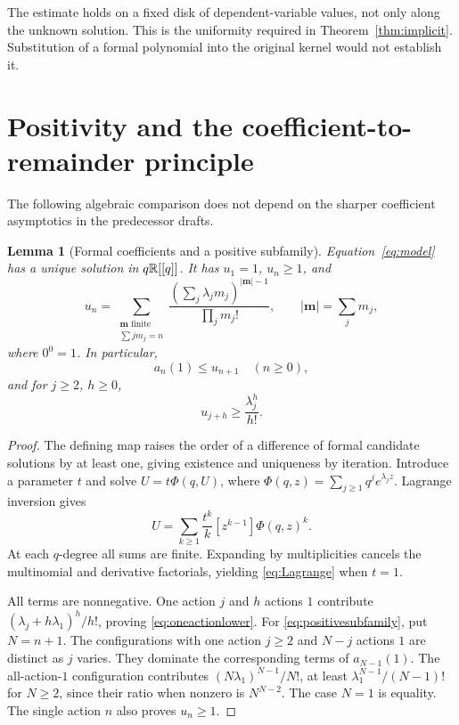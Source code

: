 \documentclass[11pt,a4paper]{article}
\numberwithin{equation}{section}
\newtheorem{lemma}[theorem]{Lemma}
\theoremstyle{definition}\newtheorem{definition}[theorem]{Definition}
\theoremstyle{remark}\newtheorem{remark}[theorem]{Remark}
\begin{document}
The estimate holds on a fixed disk of dependent-variable values, not
only along the unknown solution. This is the uniformity required in
Theorem~\ref{thm:implicit}. Substitution of a formal polynomial into the
original kernel would not establish it.

\section{Positivity and the coefficient-to-remainder principle}
\label{sec:bridge}
The following algebraic comparison does not depend on the sharper
coefficient asymptotics in the predecessor drafts.

\begin{lemma}[Formal coefficients and a positive subfamily]
\label{lem:positivity}
Equation~\eqref{eq:model} has a unique solution in $q\mathbb R[[q]]$.
It has $u_1=1$, $u_n\ge1$, and
\begin{equation}
 u_n=\sum_{\substack{\boldsymbol m\text{ finite}\\\sum j m_j=n}}
 \frac{(\sum_j\lambda_jm_j)^{|\boldsymbol m|-1}}{\prod_jm_j!},
 \qquad |\boldsymbol m|=\sum_jm_j,
 \label{eq:Lagrange}
\end{equation}
where $0^0=1$. In particular,
\begin{equation}
 a_n(1)\le u_{n+1}\quad(n\ge0),
 \label{eq:positivesubfamily}
\end{equation}
and for $j\ge2$, $h\ge0$,
\begin{equation}
 u_{j+h}\ge\frac{\lambda_j^h}{h!}.
 \label{eq:oneactionlower}
\end{equation}
\end{lemma}
\begin{proof}
The defining map raises the order of a difference of formal candidate
solutions by at least one, giving existence and uniqueness by iteration.
Introduce a parameter $t$ and solve $U=t\Phi(q,U)$, where
$\Phi(q,z)=\sum_{j\ge1}q^je^{\lambda_jz}$. Lagrange inversion gives
\[
 U=\sum_{k\ge1}\frac{t^k}{k}[z^{k-1}]\Phi(q,z)^k.
\]
At each $q$-degree all sums are finite. Expanding by multiplicities
cancels the multinomial and derivative factorials, yielding
\eqref{eq:Lagrange} when $t=1$.

All terms are nonnegative. One action $j$ and $h$ actions $1$ contribute
$(\lambda_j+h\lambda_1)^h/h!$, proving \eqref{eq:oneactionlower}.
For \eqref{eq:positivesubfamily}, put $N=n+1$. The configurations with
one action $j\ge2$ and $N-j$ actions $1$ are distinct as $j$ varies.
They dominate the corresponding terms of $a_{N-1}(1)$. The all-action-$1$
configuration contributes $(N\lambda_1)^{N-1}/N!$, at least
$\lambda_1^{N-1}/(N-1)!$ for $N\ge2$, since their ratio when nonzero
is $N^{N-2}$. The case $N=1$ is equality. The single action $n$ also
proves $u_n\ge1$.
\end{proof}
\end{document}
